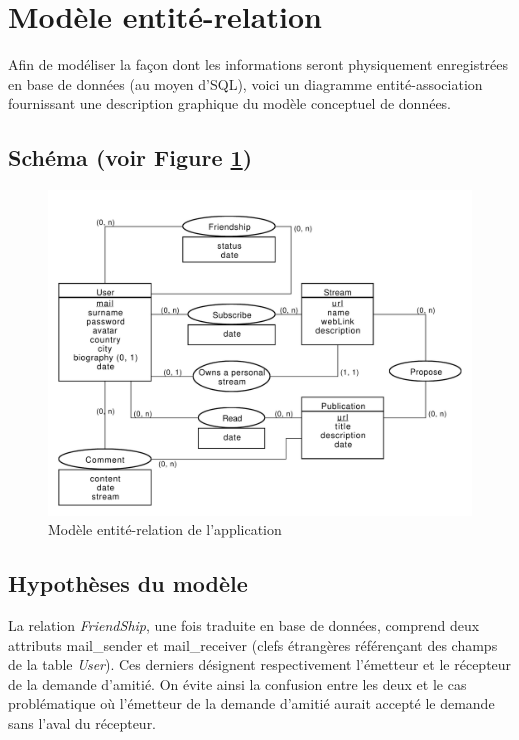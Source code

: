 \documentclass[a4paper,10pt]{article}
\begin{document}
\section{Modèle entité-relation}

Afin de modéliser la façon dont les informations seront physiquement enregistrées en base de données (au moyen d'SQL), voici un diagramme entité-association fournissant une description graphique du modèle conceptuel de données.

\subsection{Schéma {\small (voir Figure \ref{fig:Entite-Relation})}} 

	\begin{figure}[h!]
	    \centering
	    \includegraphics[width=15cm]{Entite-Relation-2.pdf}
	    \caption{Modèle entité-relation de l'application}
	    \label{fig:Entite-Relation}
	\end{figure}

\subsection{Hypothèses du modèle}

La relation \textsl{FriendShip}, une fois traduite en base de données, comprend deux attributs mail\_sender et mail\_receiver (clefs étrangères référençant des champs de la table \textsl{User}). Ces derniers désignent respectivement l'émetteur et le récepteur de la demande d'amitié. On évite ainsi la confusion entre les deux et le cas problématique où l'émetteur de la demande d'amitié aurait accepté le demande sans l'aval du récepteur.
\end{document}
